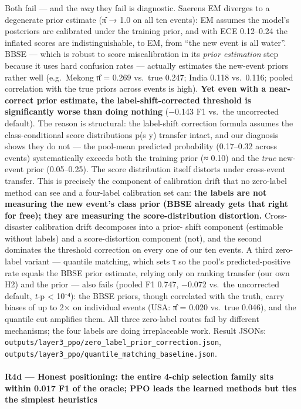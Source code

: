 Both fail --- and the \emph{way} they fail is diagnostic. Saerens EM diverges
to a degenerate prior estimate (π̂ → 1.0 on all ten events): EM assumes
the model's posteriors are calibrated under the training prior, and with
ECE 0.12--0.24 the inflated scores are indistinguishable, to EM, from ``the
new event is all water''. BBSE --- which is robust to score
miscalibration in its \emph{prior estimation} step because it uses hard
confusion rates --- actually estimates the new-event priors rather well
(e.g.~Mekong π̂ = 0.269 vs.~true 0.247; India 0.118 vs.~0.116; pooled
correlation with the true priors across events is high). \textbf{Yet even
with a near-correct prior estimate, the label-shift-corrected threshold
is significantly worse than doing nothing} (−0.143 F1 vs.~the
uncorrected default). The reason is structural: the label-shift
correction formula assumes the class-conditional score distributions
p(s \textbar{} y) transfer intact, and our diagnosis shows they do not --- the
pool-mean predicted probability (0.17--0.32 across events) systematically
exceeds both the training prior (≈ 0.10) and the \emph{true} new-event prior
(0.05--0.25). The score distribution itself distorts under cross-event
transfer. This is precisely the component of calibration drift that no
zero-label method can see and a four-label calibration set can: \textbf{the
labels are not measuring the new event's class prior (BBSE already
gets that right for free); they are measuring the score-distribution
distortion.} Cross-disaster calibration drift decomposes into a prior-
shift component (estimable without labels) and a score-distortion
component (not), and the second dominates the threshold correction on
every one of our ten events. A third zero-label variant --- quantile
matching, which sets τ so the pool's predicted-positive rate equals the
BBSE prior estimate, relying only on ranking transfer (our own H2) and
the prior --- also fails (pooled F1 0.747, −0.072 vs.~the uncorrected
default, \emph{t}-p \textless{} 10⁻⁴): the BBSE priors, though correlated with the
truth, carry biases of up to 2× on individual events (USA: π̂ = 0.020
vs.~true 0.046), and the quantile cut amplifies them. All three
zero-label routes fail by different mechanisms; the four labels are
doing irreplaceable work. Result JSONs:
\texttt{outputs/layer3\_ppo/zero\_label\_prior\_correction.json},
\texttt{outputs/layer3\_ppo/quantile\_matching\_baseline.json}.

\paragraph{R4d --- Honest positioning: the entire 4-chip selection family sits within 0.017 F1 of the oracle; PPO leads the learned methods but ties the simplest heuristics}\label{r4d-honest-positioning-the-entire-4-chip-selection-family-sits-within-0.017-f1-of-the-oracle-ppo-leads-the-learned-methods-but-ties-the-simplest-heuristics}

